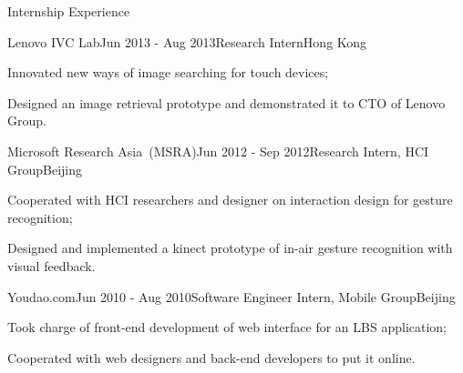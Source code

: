 \documentclass{cv_professional-en} %
\begin{document}

\begin{rSection}{Internship Experience}
    
\begin{rSubsection}{Lenovo IVC Lab}{Jun 2013 - Aug 2013}{Research Intern}{Hong Kong}
    \item Innovated new ways of image searching for touch devices;
    \item Designed an image retrieval prototype and demonstrated it to CTO of Lenovo Group.
\end{rSubsection}

\begin{rSubsection}{Microsoft Research Asia~(MSRA)}{Jun 2012 - Sep 2012}{Research Intern, HCI Group}{Beijing}
    \item Cooperated with HCI researchers and designer on interaction design for gesture recognition;
    \item Designed and implemented a kinect prototype of in-air gesture recognition with visual feedback.
\end{rSubsection}

\begin{rSubsection}{Youdao.com}{Jun 2010 - Aug 2010}{Software Engineer Intern, Mobile Group}{Beijing}
    \item Took charge of front-end development of web interface for an LBS application;
    \item Cooperated with web designers and back-end developers to put it online.
\end{rSubsection}

\end{rSection}


\end{document}

